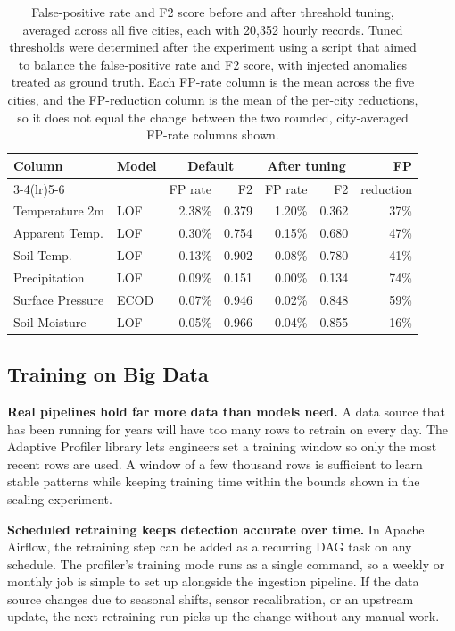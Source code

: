\documentclass[12pt]{article}
\begin{document}
\begin{table}[!htbp]
\centering
\begin{tabular}{@{}l l r r r r r@{}}
\toprule
Column & Model & \multicolumn{2}{c}{Default} & \multicolumn{2}{c}{After tuning} & FP \\
\cmidrule(lr){3-4}\cmidrule(lr){5-6}
 & & FP rate & F2 & FP rate & F2 & reduction \\
\midrule
Temperature 2m   & LOF  & 2.38\% & 0.379 & 1.20\% & 0.362 & 37\% \\
Apparent Temp.   & LOF  & 0.30\% & 0.754 & 0.15\% & 0.680 & 47\% \\
Soil Temp.       & LOF  & 0.13\% & 0.902 & 0.08\% & 0.780 & 41\% \\
Precipitation    & LOF  & 0.09\% & 0.151 & 0.00\% & 0.134 & 74\% \\
Surface Pressure & ECOD & 0.07\% & 0.946 & 0.02\% & 0.848 & 59\% \\
Soil Moisture    & LOF  & 0.05\% & 0.966 & 0.04\% & 0.855 & 16\% \\
\bottomrule
\end{tabular}
\caption{False-positive rate and F2 score before and after threshold tuning, averaged across all five cities, each with 20,352 hourly records. Tuned thresholds were determined after the experiment using a script that aimed to balance the false-positive rate and F2 score, with injected anomalies treated as ground truth. Each FP-rate column is the mean across the five cities, and the FP-reduction column is the mean of the per-city reductions, so it does not equal the change between the two rounded, city-averaged FP-rate columns shown.}
\label{tab:threshold_summary}
\end{table}

\subsection{Training on Big Data}

\textbf{Real pipelines hold far more data than models need.} A data source that has been running for years will have too many rows to retrain on every day. The Adaptive Profiler library lets engineers set a training window so only the most recent rows are used. A window of a few thousand rows is sufficient to learn stable patterns while keeping training time within the bounds shown in the scaling experiment.

\textbf{Scheduled retraining keeps detection accurate over time.} In Apache Airflow, the retraining step can be added as a recurring DAG task on any schedule. The profiler's training mode runs as a single command, so a weekly or monthly job is simple to set up alongside the ingestion pipeline. If the data source changes due to seasonal shifts, sensor recalibration, or an upstream update, the next retraining run picks up the change without any manual work.
\end{document}
